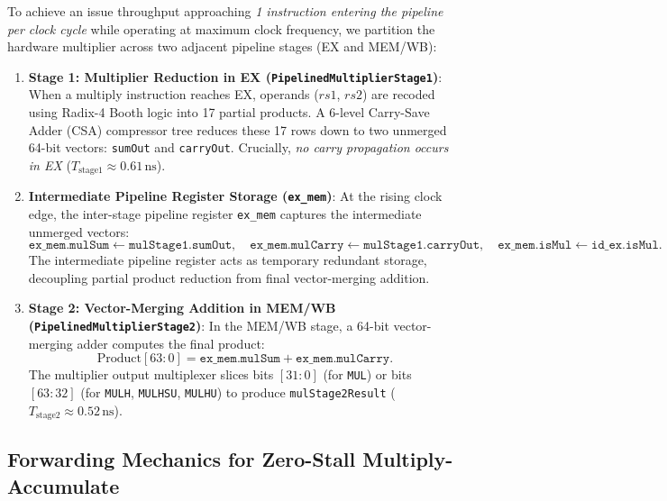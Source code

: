 To achieve an issue throughput approaching \textit{1 instruction entering the pipeline per clock cycle} while operating at maximum clock frequency, we partition the hardware multiplier across two adjacent pipeline stages (EX and MEM/WB):
\begin{enumerate}
    \item \textbf{Stage 1: Multiplier Reduction in EX (\texttt{PipelinedMultiplierStage1})}:
    When a multiply instruction reaches EX, operands ($rs1$, $rs2$) are recoded using Radix-4 Booth logic into 17 partial products. A 6-level Carry-Save Adder (CSA) compressor tree reduces these 17 rows down to two unmerged 64-bit vectors: \texttt{sumOut} and \texttt{carryOut}. Crucially, \textit{no carry propagation occurs in EX} ($T_{\text{stage1}} \approx 0.61\,\text{ns}$).
    
    \item \textbf{Intermediate Pipeline Register Storage (\texttt{ex\_mem})}:
    At the rising clock edge, the inter-stage pipeline register \texttt{ex\_mem} captures the intermediate unmerged vectors:
    \begin{equation}
    \texttt{ex\_mem.mulSum} \leftarrow \texttt{mulStage1.sumOut}, \quad \texttt{ex\_mem.mulCarry} \leftarrow \texttt{mulStage1.carryOut}, \quad \texttt{ex\_mem.isMul} \leftarrow \texttt{id\_ex.isMul}.
    \end{equation}
    The intermediate pipeline register acts as temporary redundant storage, decoupling partial product reduction from final vector-merging addition.
    
    \item \textbf{Stage 2: Vector-Merging Addition in MEM/WB (\texttt{PipelinedMultiplierStage2})}:
    In the MEM/WB stage, a 64-bit vector-merging adder computes the final product:
    \begin{equation}
    \text{Product}[63:0] = \texttt{ex\_mem.mulSum} + \texttt{ex\_mem.mulCarry}.
    \end{equation}
    The multiplier output multiplexer slices bits $[31:0]$ (for \texttt{MUL}) or bits $[63:32]$ (for \texttt{MULH}, \texttt{MULHSU}, \texttt{MULHU}) to produce \texttt{mulStage2Result} ($T_{\text{stage2}} \approx 0.52\,\text{ns}$).
\end{enumerate}

\subsection{Forwarding Mechanics for Zero-Stall Multiply-Accumulate}

